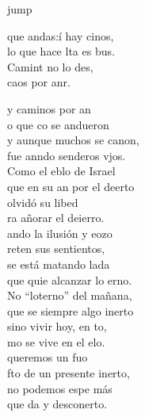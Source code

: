\begin{cancion}jump\\
	\begin{chorus}%
		 que andas:í hay cinos, \\
		lo que hace lta es bus.\\
		Camint no lo des, \\
		 caos por anr.\jump\\
	\end{chorus}%
	y caminos por an \\
	o que co se andueron\\
	y aunque muchos se canon, \\
	fue anndo senderos vjos. \\
	Como el eblo de Israel \\
	que en su an por el deerto\\
	olvidó su libed \\
	ra añorar el deierro. \\
	\jump
	ando la ilusión y eozo \\
	reten sus sentientos,\\
	se está matando lada\\
	que quie alcanzar lo erno. \\
	No “loterno” del mañana, \\
	que se siempre algo inerto\\
	sino vivir hoy, en to, \\
	mo se vive en el elo.  \\
	\jump
	 queremos un fuo \\
	fto de un presente inerto,\\
	no podemos espe más \\
	que da y desconerto. \\

\end{cancion}
